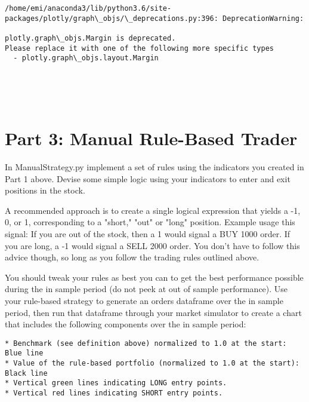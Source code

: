 \documentclass[11pt]{article}
\begin{document}
    \begin{Verbatim}[commandchars=\\\{\}]
/home/emi/anaconda3/lib/python3.6/site-packages/plotly/graph\_objs/\_deprecations.py:396: DeprecationWarning:

plotly.graph\_objs.Margin is deprecated.
Please replace it with one of the following more specific types
  - plotly.graph\_objs.layout.Margin



    \end{Verbatim}

    \begin{center}
    \end{center}
    { \hspace*{\fill} \\}
    
    \section{Part 3: Manual Rule-Based
Trader}\label{part-3-manual-rule-based-trader}

In ManualStrategy.py implement a set of rules using the indicators you
created in Part 1 above. Devise some simple logic using your indicators
to enter and exit positions in the stock.

A recommended approach is to create a single logical expression that
yields a -1, 0, or 1, corresponding to a "short," "out" or "long"
position. Example usage this signal: If you are out of the stock, then a
1 would signal a BUY 1000 order. If you are long, a -1 would signal a
SELL 2000 order. You don't have to follow this advice though, so long as
you follow the trading rules outlined above.

You should tweak your rules as best you can to get the best performance
possible during the in sample period (do not peek at out of sample
performance). Use your rule-based strategy to generate an orders
dataframe over the in sample period, then run that dataframe through
your market simulator to create a chart that includes the following
components over the in sample period:

\begin{verbatim}
* Benchmark (see definition above) normalized to 1.0 at the start: Blue line
* Value of the rule-based portfolio (normalized to 1.0 at the start): Black line
* Vertical green lines indicating LONG entry points.
* Vertical red lines indicating SHORT entry points.
\end{verbatim}
\end{document}
